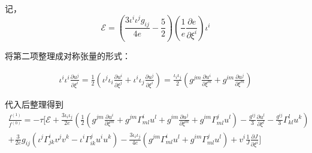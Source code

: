 \documentclass[MathematicsNumericsDerivationsAndOpenFOAM.tex]{subfiles}
\begin{document}
记，
$$
  \mathcal{E}= (\frac{3 {\iota^i\iota^jg_{ij}}}{4e}-\frac{5}{2}) (\frac{1}{e}\frac{\partial e}{\partial \xi^i})\iota^i
$$


将第二项整理成对称张量的形式：


\begin{equation}
  \begin{gathered}
    \iota^i \iota^i \frac{\partial u^j}{\partial \xi^i} =\frac{1}{2} (\iota^j \iota_i \frac{\partial u^i}{\partial \xi^j}+  \iota^i \iota_j \frac{\partial u^j}{\partial \xi^i})
    = \frac{\iota_i \iota_j}{2} (g^{jm} \frac{\partial u^i}{\partial \xi^m}+g^{im} \frac{\partial u^j}{\partial \xi^m})
  \end{gathered}
\end{equation}




代入后整理得到
\begin{equation}
  \begin{gathered}
    \frac{f^{(1)}}{f^{(0)}}=
    -\tau [\mathcal{E}
      +\frac{3\iota_i \iota_j}{2e}(\frac{1}{2} (g^{jm} \frac{\partial u^i}{\partial \xi^m}+g^{jm}\Gamma_{ml}^i u^l+g^{im} \frac{\partial u^j}{\partial \xi^m}+g^{im}\Gamma_{ml}^j u^l) -\frac{g^{ij}}{3}\frac{\partial u^l}{\partial \xi^l}-\frac{g^{ij}}{3} \Gamma_{kl}^l u^k) \\
      + \frac{3}{2e} g_{ij} (\iota^j\Gamma_{j k}^{i} v^j v^k - \iota^i\Gamma_{i k}^{j} u^i u^k) - \frac{3\iota_i\iota_j}{4e}(g^{jm}\Gamma_{ml}^i u^l + g^{im}\Gamma_{ml}^j u^l) + v^i  \frac{1}{J}\frac{\partial J}{\partial \xi^i}
    ]
  \end{gathered}
\end{equation}
\end{document}
